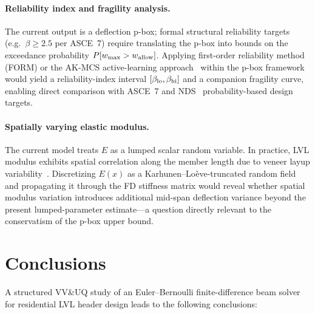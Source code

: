\documentclass[10pt,twocolumn]{article}
\begin{document}
\paragraph{Reliability index and fragility analysis.}
The current output is a deflection p-box; formal structural reliability
targets (e.g.\ $\beta \ge 2.5$ per ASCE~7) require translating the
p-box into bounds on the exceedance probability
$P[w_{\rm max} > w_{\rm allow}]$.
Applying first-order reliability method (FORM) or the AK-MCS
active-learning approach~\cite{du2023} within the p-box framework
would yield a reliability-index interval $[\beta_{\rm lo},\beta_{\rm hi}]$
and a companion fragility curve, enabling direct comparison with
ASCE~7 and NDS~\cite{nds2018} probability-based design targets.

\paragraph{Spatially varying elastic modulus.}
The current model treats $E$ as a lumped scalar random variable.
In practice, LVL modulus exhibits spatial correlation along the
member length due to veneer layup variability~\cite{leichsenring2018}.
Discretizing $E(x)$ as a Karhu\-nen--Lo\`eve-truncated random field
and propagating it through the FD stiffness matrix would reveal whether
spatial modulus variation introduces additional mid-span deflection
variance beyond the present lumped-parameter estimate---a question
directly relevant to the conservatism of the p-box upper bound.

\section{Conclusions}
\label{sec:conc}

A structured VV\&UQ study of an Euler--Bernoulli finite-difference
beam solver for residential LVL header design leads to the following
conclusions:
\end{document}
